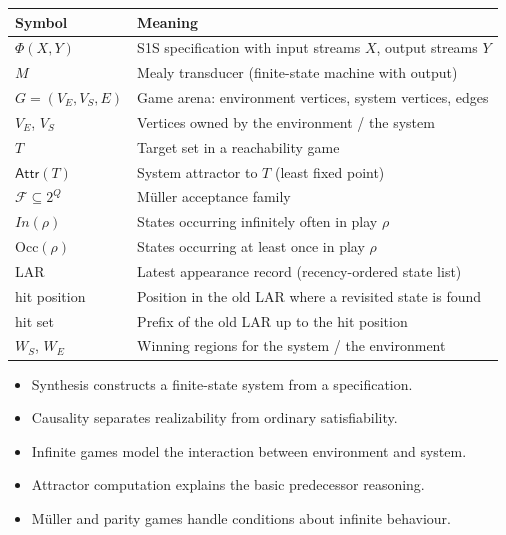 \begin{center}
\begin{tabular}{@{}l l@{}}
\toprule
\textbf{Symbol} & \textbf{Meaning} \\
\midrule
$\Phi(X,Y)$                  & S1S specification with input streams $X$, output streams $Y$ \\
$M$                          & Mealy transducer (finite-state machine with output) \\
$G=(V_E,V_S,E)$             & Game arena: environment vertices, system vertices, edges \\
$V_E$, $V_S$                & Vertices owned by the environment / the system \\
$T$                          & Target set in a reachability game \\
$\mathsf{Attr}(T)$          & System attractor to $T$ (least fixed point) \\
$\mathcal{F}\subseteq 2^Q$  & M\"uller acceptance family \\
$In(\rho)$                & States occurring infinitely often in play $\rho$ \\
$\mathrm{Occ}(\rho)$        & States occurring at least once in play $\rho$ \\
LAR                          & Latest appearance record (recency-ordered state list) \\
hit position                 & Position in the old LAR where a revisited state is found \\
hit set                      & Prefix of the old LAR up to the hit position \\
$W_S$, $W_E$                & Winning regions for the system / the environment \\
\bottomrule
\end{tabular}
\end{center}

\begin{summarybox}
\begin{itemize}[nosep]
  \item Synthesis constructs a finite-state system from a specification.
  \item Causality separates realizability from ordinary satisfiability.
  \item Infinite games model the interaction between environment and system.
  \item Attractor computation explains the basic predecessor reasoning.
  \item M\"uller and parity games handle conditions about infinite behaviour.
\end{itemize}
\end{summarybox}

